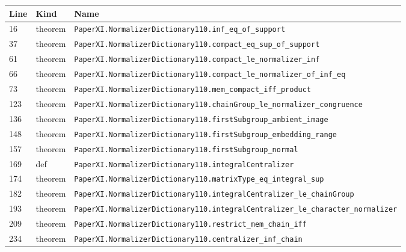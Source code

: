 \documentclass[10pt,oneside]{book}
\begin{document}
\begin{longtable}{@{}p{}p{}p{}@{}}\toprule Line&Kind&Name\\\midrule\endhead

16&theorem&\nolinkurl{PaperXI.NormalizerDictionary110.inf_eq_of_support}\\

37&theorem&\nolinkurl{PaperXI.NormalizerDictionary110.compact_eq_sup_of_support}\\

61&theorem&\nolinkurl{PaperXI.NormalizerDictionary110.compact_le_normalizer_inf}\\

66&theorem&\nolinkurl{PaperXI.NormalizerDictionary110.compact_le_normalizer_of_inf_eq}\\

73&theorem&\nolinkurl{PaperXI.NormalizerDictionary110.mem_compact_iff_product}\\

123&theorem&\nolinkurl{PaperXI.NormalizerDictionary110.chainGroup_le_normalizer_congruence}\\

136&theorem&\nolinkurl{PaperXI.NormalizerDictionary110.firstSubgroup_ambient_image}\\

148&theorem&\nolinkurl{PaperXI.NormalizerDictionary110.firstSubgroup_embedding_range}\\

157&theorem&\nolinkurl{PaperXI.NormalizerDictionary110.firstSubgroup_normal}\\

169&def&\nolinkurl{PaperXI.NormalizerDictionary110.integralCentralizer}\\

174&theorem&\nolinkurl{PaperXI.NormalizerDictionary110.matrixType_eq_integral_sup}\\

182&theorem&\nolinkurl{PaperXI.NormalizerDictionary110.integralCentralizer_le_chainGroup}\\

193&theorem&\nolinkurl{PaperXI.NormalizerDictionary110.integralCentralizer_le_character_normalizer}\\

209&theorem&\nolinkurl{PaperXI.NormalizerDictionary110.restrict_mem_chain_iff}\\

234&theorem&\nolinkurl{PaperXI.NormalizerDictionary110.centralizer_inf_chain}\\


\end{longtable}
\end{document}
